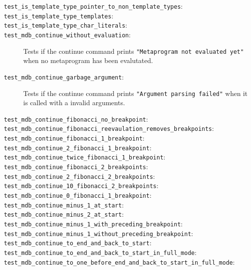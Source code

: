 \begin{description}
    \item[\texttt{test\_is\_template\_type\_pointer\_to\_non\_template\_types}:]
    \item[\texttt{test\_is\_template\_type\_templates}:]
    \item[\texttt{test\_is\_template\_type\_char\_literals}:]
    \item[\texttt{test\_mdb\_continue\_without\_evaluation}:]
        Tests if the continue command prints
        \texttt{"Metaprogram not evaluated yet"} when no metaprogram has been
        evalutated.
    \item[\texttt{test\_mdb\_continue\_garbage\_argument}:]
        Tests if the continue command prints
        \texttt{"Argument parsing failed"} when it is called with a invalid
        arguments.
    \item[\texttt{test\_mdb\_continue\_fibonacci\_no\_breakpoint}:]
    \item[\texttt{test\_mdb\_continue\_fibonacci\_reevaulation\_removes\_breakpoints}:]
    \item[\texttt{test\_mdb\_continue\_fibonacci\_1\_breakpoint}:]
    \item[\texttt{test\_mdb\_continue\_2\_fibonacci\_1\_breakpoint}:]
    \item[\texttt{test\_mdb\_continue\_twice\_fibonacci\_1\_breakpoint}:]
    \item[\texttt{test\_mdb\_continue\_fibonacci\_2\_breakpoints}:]
    \item[\texttt{test\_mdb\_continue\_2\_fibonacci\_2\_breakpoints}:]
    \item[\texttt{test\_mdb\_continue\_10\_fibonacci\_2\_breakpoints}:]
    \item[\texttt{test\_mdb\_continue\_0\_fibonacci\_1\_breakpoint}:]
    \item[\texttt{test\_mdb\_continue\_minus\_1\_at\_start}:]
    \item[\texttt{test\_mdb\_continue\_minus\_2\_at\_start}:]
    \item[\texttt{test\_mdb\_continue\_minus\_1\_with\_preceding\_breakpoint}:]
    \item[\texttt{test\_mdb\_continue\_minus\_1\_without\_preceding\_breakpoint}:]
    \item[\texttt{test\_mdb\_continue\_to\_end\_and\_back\_to\_start}:]
    \item[\texttt{test\_mdb\_continue\_to\_end\_and\_back\_to\_start\_in\_full\_mode}:]
    \item[\texttt{test\_mdb\_continue\_to\_one\_before\_end\_and\_back\_to\_start\_in\_full\_mode}:]

\end{description}
